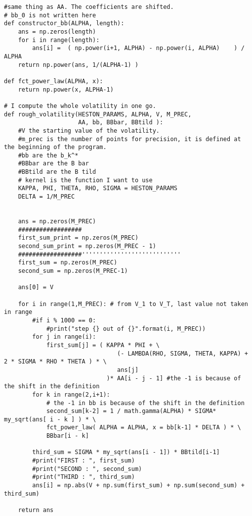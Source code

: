\begin{Verbatim}[fontsize=\tiny]
#same thing as AA. The coefficients are shifted.
# bb_0 is not written here
def constructor_bb(ALPHA, length):
    ans = np.zeros(length)
    for i in range(length):
        ans[i] =  ( np.power(i+1, ALPHA) - np.power(i, ALPHA)    ) / ALPHA
    return np.power(ans, 1/(ALPHA-1) )

def fct_power_law(ALPHA, x):
    return np.power(x, ALPHA-1)

# I compute the whole volatility in one go.
def rough_volatility(HESTON_PARAMS, ALPHA, V, M_PREC,
                     AA, bb, BBbar, BBtild ):
    #V the starting value of the volatility.
    #m_prec is the number of points for precision, it is defined at the beginning of the program.
    #bb are the b_k^*
    #BBbar are the B bar
    #BBtild are the B tild
    # kernel is the function I want to use
    KAPPA, PHI, THETA, RHO, SIGMA = HESTON_PARAMS
    DELTA = 1/M_PREC


    ans = np.zeros(M_PREC)
    ##################
    first_sum_print = np.zeros(M_PREC)
    second_sum_print = np.zeros(M_PREC - 1)
    ##################''''''''''''''''''''''''''''
    first_sum = np.zeros(M_PREC)
    second_sum = np.zeros(M_PREC-1)

    ans[0] = V

    for i in range(1,M_PREC): # from V_1 to V_T, last value not taken in range
        #if i % 1000 == 0:
            #print("step {} out of {}".format(i, M_PREC))
        for j in range(i):
            first_sum[j] = ( KAPPA * PHI + \
                                (- LAMBDA(RHO, SIGMA, THETA, KAPPA) + 2 * SIGMA * RHO * THETA ) * \
                                ans[j]
                             )* AA[i - j - 1] #the -1 is because of the shift in the definition
        for k in range(2,i+1):
            # the -1 in bb is because of the shift in the definition
            second_sum[k-2] = 1 / math.gamma(ALPHA) * SIGMA* my_sqrt(ans[ i - k ] ) * \
            fct_power_law( ALPHA = ALPHA, x = bb[k-1] * DELTA ) * \
            BBbar[i - k]

        third_sum = SIGMA * my_sqrt(ans[i - 1]) * BBtild[i-1]
        #print("FIRST : ", first_sum)
        #print("SECOND : ", second_sum)
        #print("THIRD : ", third_sum)
        ans[i] = np.abs(V + np.sum(first_sum) + np.sum(second_sum) + third_sum)

    return ans
\end{Verbatim}














